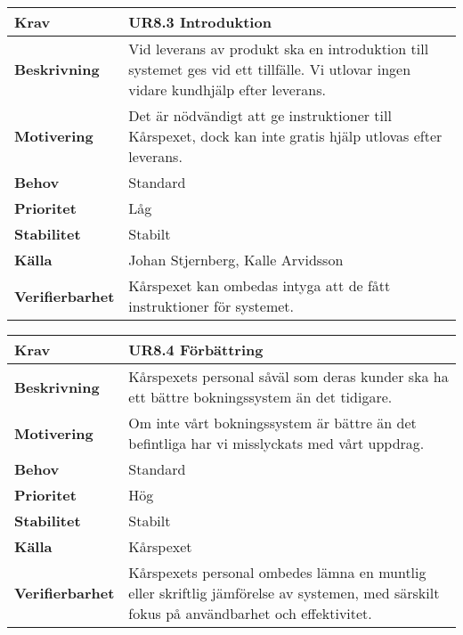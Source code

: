 \documentclass[a4paper, twoside, 11pt, titlepage]{article}
\begin{document}
		\begin {table} [ht] \begin{tabular} { p{2.6cm} p{12.5cm} }
			\hline
			{\sffamily\textbf{Krav}} & {\sffamily\textbf{UR8.3 Introduktion}} \\
			\hline
			{\sffamily\textbf{Beskrivning}} & {Vid leverans av produkt ska en introduktion till systemet ges vid ett tillfälle. Vi utlovar ingen vidare kundhjälp efter leverans.} \\
			\hline
			{\sffamily\textbf{Motivering}} & {Det är nödvändigt att ge instruktioner till Kårspexet, dock kan inte gratis hjälp utlovas efter leverans.} \\
			\hline
			{\sffamily\textbf{Behov}} & {Standard} \\
			\hline
			{\sffamily\textbf{Prioritet}} & {Låg} \\
			\hline
			{\sffamily\textbf{Stabilitet}} & {Stabilt} \\
			\hline
			{\sffamily\textbf{Källa}} & {Johan Stjernberg, Kalle Arvidsson} \\
			\hline
			{\sffamily\textbf{Verifierbarhet}} & {Kårspexet kan ombedas intyga att de fått instruktioner för systemet.} \\
			\hline
		\end{tabular} \end{table} \FloatBarrier
		\vspace{6mm}

		\begin {table} [ht] \begin{tabular} { p{2.6cm} p{12.5cm} }
			\hline
			{\sffamily\textbf{Krav}} & {\sffamily\textbf{UR8.4 Förbättring}} \\
			\hline
			{\sffamily\textbf{Beskrivning}} & {Kårspexets personal såväl som deras kunder ska ha ett bättre bokningssystem än det tidigare.} \\
			\hline
			{\sffamily\textbf{Motivering}} & {Om inte vårt bokningssystem är bättre än det befintliga har vi misslyckats med vårt uppdrag.} \\
			\hline
			{\sffamily\textbf{Behov}} & {Standard} \\
			\hline
			{\sffamily\textbf{Prioritet}} & {Hög} \\
			\hline
			{\sffamily\textbf{Stabilitet}} & {Stabilt} \\
			\hline
			{\sffamily\textbf{Källa}} & {Kårspexet} \\
			\hline
			{\sffamily\textbf{Verifierbarhet}} & {Kårspexets personal ombedes lämna en muntlig eller skriftlig jämförelse av systemen, med särskilt fokus på användbarhet och effektivitet.} \\
			\hline
		\end{tabular} \end{table} \FloatBarrier
		\vspace{6mm}
\end{document}
